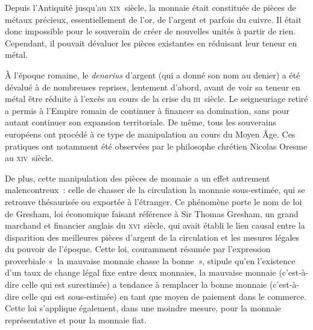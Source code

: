 
Depuis l'Antiquité jusqu'au \textsc{xix}\ieme{}~siècle, la monnaie était constituée de pièces de métaux précieux, essentiellement de l'or, de l'argent et parfois du cuivre. Il était donc impossible pour le souverain de créer de nouvelles unités à partir de rien. Cependant, il pouvait dévaluer les pièces existantes en réduisant leur teneur en métal.

À l'époque romaine, le \emph{denarius} d'argent (qui a donné son nom au denier) a été dévalué à de nombreuses reprises, lentement d'abord, avant de voir sa teneur en métal être réduite à l'excès au cours de la crise du \textsc{iii}\ieme{}~siècle. Le seigneuriage retiré a permis à l'Empire romain de continuer à financer sa domination, sans pour autant continuer son expansion territoriale. De même, tous les souverains européens ont procédé à ce type de manipulation au cours du Moyen Âge. Ces pratiques ont notamment été observées par le philosophe chrétien Nicolas Oresme au \textsc{xiv}\ieme{}~siècle. %

De plus, cette manipulation des pièces de monnaie a un effet autrement malencontreux~: celle de chasser de la circulation la monnaie sous-estimée, qui se retrouve thésaurisée ou exportée à l'étranger. Ce phénomène porte le nom de loi de Gresham, loi économique faisant référence à Sir Thomas Gresham, un grand marchand et financier anglais du \textsc{xvi}\ieme{}~siècle, qui avait établi le lien causal entre la disparition des meilleures pièces d'argent de la circulation et les mesures légales du pouvoir de l'époque. Cette loi, couramment résumée par l'expression proverbiale «~la mauvaise monnaie chasse la bonne~», stipule qu'en l'existence d'un taux de change légal fixe entre deux monnaies, la mauvaise monnaie (c'est-à-dire celle qui est surestimée) a tendance à remplacer la bonne monnaie (c'est-à-dire celle qui est sous-estimée) en tant que moyen de paiement dans le commerce. Cette loi s'applique également, dans une moindre mesure, pour la monnaie représentative et pour la monnaie fiat.

